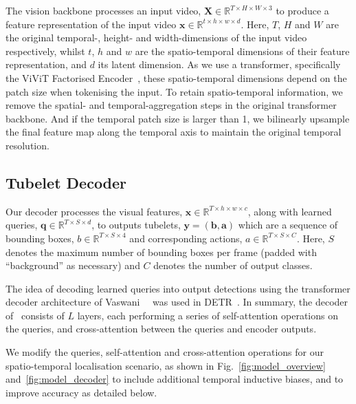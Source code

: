 \documentclass[10pt,twocolumn,letterpaper]{article}
\def \paravspace {-0.7\baselineskip}
\begin{document}
The vision backbone processes an input video, $\mathbf{X} \in \mathbb{R}^{T \times H \times W \times 3}$ to produce a feature representation of the input video $\mathbf{x} \in \mathbb{R}^{t \times h \times w \times d}$.
Here, $T$, $H$ and $W$ are the original temporal-, height- and width-dimensions of the input video respectively, whilst $t$, $h$ and $w$ are the spatio-temporal dimensions of their feature representation, and $d$ its latent dimension.
As we use a transformer, specifically the ViViT Factorised Encoder~\cite{arnab2021vivit}, these spatio-temporal dimensions depend on the patch 
size when tokenising the input.
To retain spatio-temporal information, we remove the spatial- and temporal-aggregation steps in the original transformer backbone.
And if the temporal patch size is larger than 1, we bilinearly upsample the final feature map along the temporal axis to maintain the original temporal resolution.


\subsection{Tubelet Decoder}
\label{sec:method_decoder}

Our decoder processes the visual features, $\mathbf{x} \in \mathbb{R}^{T \times h \times w \times c}$, along with learned queries, $\mathbf{q} \in \mathbb{R}^{T \times S \times d}$, to outputs tubelets, $\mathbf{y} = (\mathbf{b}, \mathbf{a})$ which are a sequence of bounding boxes, $b \in \mathbb{R}^{T \times S \times 4}$ and corresponding actions, $a \in \mathbb{R}^{T \times S \times C}$.
Here, $S$ denotes the maximum number of bounding boxes per frame (padded with ``background'' as necessary) and $C$ denotes the number of output classes. 

The idea of decoding learned queries into output detections using the transformer decoder architecture of Vaswani~\etal~\cite{vaswani_neurips_2017} was used in DETR~\cite{carion_eccv_2020}. In summary, the decoder of~\cite{carion_eccv_2020, vaswani_neurips_2017} consists of $L$ layers, each performing a series of self-attention operations on the queries, and cross-attention between the queries and encoder outputs.

We modify the queries, self-attention and cross-attention operations for our spatio-temporal localisation scenario, as shown in Fig.~\ref{fig:model_overview} and~\ref{fig:model_decoder} to include additional temporal inductive biases, and to improve accuracy as detailed below. 

\vspace{\paravspace}
\end{document}
